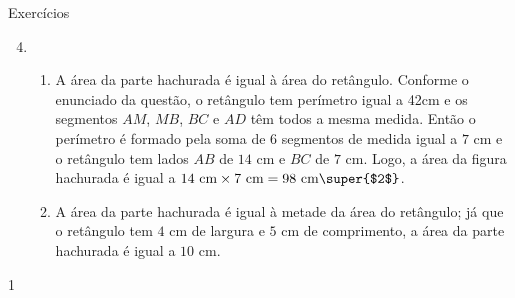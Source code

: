 \begin{answer}{Exercícios}
{\exerciselist
\begin{enumerate}\setcounter{enumi}{3}
\item 
\begin{enumerate}
\item A área da parte hachurada é igual à área do retângulo. Conforme o enunciado da questão, o retângulo tem perímetro igual a 42cm e os segmentos $AM$, $MB$, $BC$ e $AD$ têm todos a mesma medida. Então o perímetro é formado pela soma de 6 segmentos de medida igual a $7$ cm e o retângulo tem lados $AB$ de $14$ cm e $BC$ de $7$ cm. Logo, a área da figura hachurada é igual a $14\text{ cm}\times7\text{ cm}=98\text{ cm\super{$2$}}$.
\item A área da parte hachurada é igual à metade da área do retângulo; já que o retângulo tem $4$ cm de largura e $5$ cm de comprimento, a área da parte hachurada é igual a $10$ cm.
\end{enumerate}
\end{enumerate}
}{1}
\end{answer}
\exercise
{}\label{transformacoes-exercise1}

